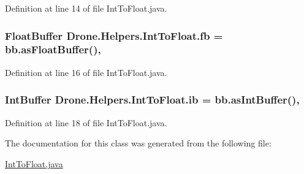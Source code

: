 Definition at line 14 of file Int\+To\+Float.\+java.

\hypertarget{class_drone_1_1_helpers_1_1_int_to_float_a3154ee6f1ff63a7fffd9dca883095cb3}{}
\subsubsection[{fb}]{\setlength{\rightskip}{0pt plus 5cm}Float\+Buffer Drone.\+Helpers.\+Int\+To\+Float.\+fb = bb.\+as\+Float\+Buffer()\hspace{0.3cm}{\ttfamily [static]}, {\ttfamily [private]}}\label{class_drone_1_1_helpers_1_1_int_to_float_a3154ee6f1ff63a7fffd9dca883095cb3}


Definition at line 16 of file Int\+To\+Float.\+java.

\hypertarget{class_drone_1_1_helpers_1_1_int_to_float_af3a881fde7f3c3637248f94e69ec85a8}{}
\subsubsection[{ib}]{\setlength{\rightskip}{0pt plus 5cm}Int\+Buffer Drone.\+Helpers.\+Int\+To\+Float.\+ib = bb.\+as\+Int\+Buffer()\hspace{0.3cm}{\ttfamily [static]}, {\ttfamily [private]}}\label{class_drone_1_1_helpers_1_1_int_to_float_af3a881fde7f3c3637248f94e69ec85a8}


Definition at line 18 of file Int\+To\+Float.\+java.



The documentation for this class was generated from the following file\+:\begin{DoxyCompactItemize}
\item 
\hyperlink{_int_to_float_8java}{Int\+To\+Float.\+java}\end{DoxyCompactItemize}

